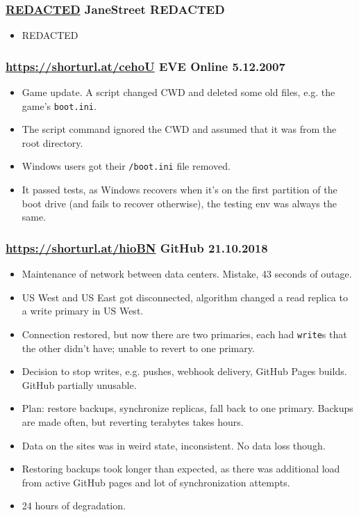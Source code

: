\documentclass[handout]{beamer}
\begin{document}
 \begin{frame}
	\frametitle{
		\href{REDACTED}{REDACTED}
		JaneStreet
		REDACTED
	 }
	\begin{itemize}
		\item REDACTED
	\end{itemize}
 \end{frame}

 \begin{frame}
	\frametitle{
		\href{https://shorturl.at/cehoU}{https://shorturl.at/cehoU}
		EVE Online
		5.12.2007
	}
	\begin{itemize}
		\item Game update. A script changed CWD and deleted some old files, e.g. the game's \texttt{boot.ini}. \pause
		\item The script command ignored the CWD and assumed that it was from the root directory. \pause
		\item Windows users got their \texttt{/boot.ini} file removed. \pause
		\item It passed tests, as Windows recovers when it's on the first partition of the boot drive
			 (and fails to recover otherwise), the testing env was always the same.
	\end{itemize}
 \end{frame}

 \begin{frame}
	\frametitle{
		\href{https://shorturl.at/hioBN}{https://shorturl.at/hioBN}
		GitHub
		21.10.2018
	}
	\begin{itemize}
		\item Maintenance of network between data centers. Mistake, 43 seconds of outage. \pause
		\item US West and US East got disconnected, algorithm changed a read replica to a write primary in US West. \pause
		\item Connection restored, but now there are two primaries, each had \texttt{write}s that the other didn't have; unable to revert to one primary. \pause
		\item Decision to stop writes, e.g. pushes, webhook delivery, GitHub Pages builds. GitHub partially unusable. \pause
		\item Plan: restore backups, synchronize replicas, fall back to one primary. Backups are made often, but reverting terabytes takes hours. \pause
		\item Data on the sites was in weird state, inconsistent. No data loss though. \pause
		\item Restoring backups took longer than expected, as there was additional load from active GitHub pages and lot of synchronization attempts. \pause
		\item 24 hours of degradation.
	\end{itemize}
 \end{frame}
\end{document}
